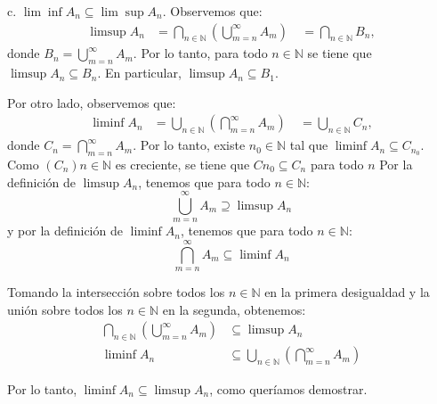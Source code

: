 \documentclass{report}
\begin{document}
    c. $\lim \inf A_n \subseteq \lim \sup A_n$. Observemos que:
    \begin{align*}
    \limsup A_n &= \bigcap_{n \in \mathbb{N}}(\bigcup_{m=n}^{\infty} A_m) \
    &= \bigcap_{n \in \mathbb{N}} B_n,
    \end{align*}
    donde $B_n=\bigcup_{m=n}^{\infty} A_m$. Por lo tanto, para todo $n \in \mathbb{N}$ se tiene que $\limsup A_n \subseteq B_n$. En particular, $\limsup A_n \subseteq B_1$.

    Por otro lado, observemos que:
    \begin{align*}
    \liminf A_n &= \bigcup_{n \in \mathbb{N}}(\bigcap_{m=n}^{\infty} A_m) \
    &= \bigcup_{n \in \mathbb{N}} C_n,
    \end{align*}
    donde $C_n=\bigcap_{m=n}^{\infty} A_m$. Por lo tanto, existe $n_0 \in \mathbb{N}$ tal que $\liminf A_n \subseteq C_{n_0}$. Como $(C_n){n \in \mathbb{N}}$ es creciente, se tiene que $C{n_0} \subseteq C_n$ para todo $n$
    Por la definición de $\limsup A_n$, tenemos que para todo $n \in \mathbb{N}$:
    $$\bigcup_{m=n}^{\infty} A_m \supseteq \limsup A_n$$
    y por la definición de $\liminf A_n$, tenemos que para todo $n \in \mathbb{N}$:
    $$\bigcap_{m=n}^{\infty} A_m \subseteq \liminf A_n$$

    Tomando la intersección sobre todos los $n \in \mathbb{N}$ en la primera desigualdad y la unión sobre todos los $n \in \mathbb{N}$ en la segunda, obtenemos:
    \begin{align*}
    \bigcap_{n \in \mathbb{N}}(\bigcup_{m=n}^{\infty} A_m) &\subseteq \limsup A_n \\
    \liminf A_n &\subseteq \bigcup_{n \in \mathbb{N}}(\bigcap_{m=n}^{\infty} A_m)
    \end{align*}

    Por lo tanto, $\liminf A_n \subseteq \limsup A_n$, como queríamos demostrar.
\end{document}
